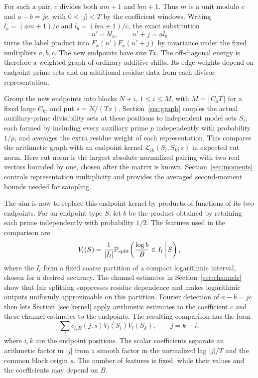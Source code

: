 For such a pair, $c$ divides both $am+1$ and $bm+1$.  Thus $m$ is a unit
modulo $c$ and $a-b=jc$, with $0<|j|<T$ by the coefficient windows.  Writing
$l_a=(am+1)/c$ and $l_b=(bm+1)/c$, the exact substitution
\[
 n'=b l_a,\qquad n'+j=a l_b
\]
turns the label product into $\overline{F_x(n')}F_x(n'+j)$ by invariance
under the fixed multipliers $a,b,c$.  The new endpoints have size $Tx$.
The off-diagonal energy is therefore a weighted graph of ordinary additive
shifts.  Its edge weights depend on endpoint prime sets and on additional
residue data from each divisor representation.

Group the new endpoints into blocks $N+i$, $1\le i\le M$, with
$M=\lceil C_6T\rceil$ for a fixed large $C_6$, and put $s=N/(Tx)$.
Section~\ref{sec:graph} couples the actual auxiliary-prime divisibility
sets at these positions to independent model sets $S_i$, each
formed by including every auxiliary prime $p$ independently with probability $1/p$, and averages
the extra residue weight of each representation.  This compares the
arithmetic graph with an endpoint kernel
$\mathcal L_{ik}(S_i,S_k;s)$ in expected cut norm.  Here cut norm is the
largest absolute normalized pairing with two real vectors bounded by one,
chosen after the matrix is known.  Section~\ref{sec:moments} controls
representation multiplicity and provides the averaged second-moment
bounds needed for sampling.

The aim is now to replace this endpoint kernel by products of functions of
its two endpoints.  For an endpoint type $S$, let $b$ be the product
obtained by retaining each prime independently
with probability $1/2$.  The features used in the comparison are
\[
 V_l(S)=\frac1{|I_l|}
   \mathbb P_{\rm split}\!\left(\frac{\log b}{B}\in I_l\,\middle|\,S\right),
\]
where the $I_l$ form a fixed coarse partition of a compact logarithmic
interval, chosen for a desired accuracy.  The channel estimates in Section~\ref{sec:channels} show that
fair splitting suppresses residue dependence and makes logarithmic
outputs uniformly approximable on this partition.  Fourier detection of
$a-b=jc$ then lets Section~\ref{sec:kernel} apply arithmetic estimates to
the coefficient $c$ and these channel estimates to the endpoints.  The
resulting comparison has the form
\[
 \sum_l c_{l,B}(j,s)V_l(S_i)V_l(S_k),\qquad j=k-i,
\]
where $i,k$ are the endpoint positions.  The scalar coefficients separate
an arithmetic factor in $|j|$ from a smooth factor in the normalized lag
$|j|/T$ and the common block origin $s$.  The number of features is fixed,
while their values and the coefficients may depend on $B$.

